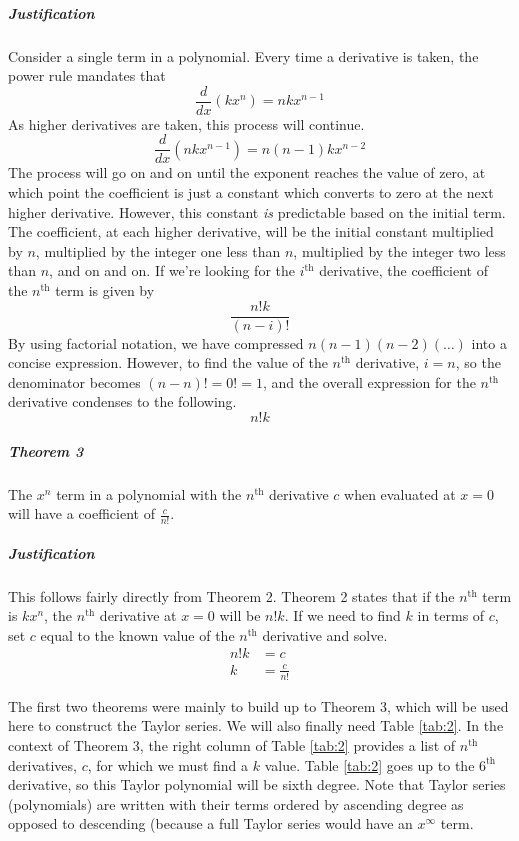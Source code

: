 \documentclass{article}
\begin{document}
\subparagraph{Justification} Consider a single term in a polynomial. Every time a derivative is taken, the power rule mandates that
\begin{equation*}
    \frac{d}{dx}(kx^n)=nkx^{n-1}
\end{equation*}
As higher derivatives are taken, this process will continue.
\begin{equation*}
    \frac{d}{dx}(nkx^{n-1})=n(n-1)kx^{n-2}
\end{equation*}
The process will go on and on until the exponent reaches the value of zero, at which point the coefficient is just a constant which converts to zero at the next higher derivative. However, this constant \emph{is} predictable based on the initial term. The coefficient, at each higher derivative, will be the initial constant multiplied by $n$, multiplied by the integer one less than $n$, multiplied by the integer two less than $n$, and on and on. If we're looking for the $i^\text{th}$ derivative, the coefficient of the $n^\text{th}$ term is given by
\begin{equation*}
    \frac{n!k}{(n-i)!}
\end{equation*}
By using factorial notation, we have compressed $n(n-1)(n-2)(\ldots)$ into a concise expression. However, to find the value of the $n^\text{th}$ derivative, $i=n$, so the denominator becomes $(n-n)!=0!=1$, and the overall expression for the $n^\text{th}$ derivative condenses to the following.
\begin{equation*}
    n!k
\end{equation*}
\subparagraph{Theorem 3} The $x^n$ term in a polynomial with the $n^\text{th}$ derivative $c$ when evaluated at $x=0$ will have a coefficient of $\frac{c}{n!}$.
\subparagraph{Justification} This follows fairly directly from Theorem 2. Theorem 2 states that if the $n^\text{th}$ term is $kx^n$, the $n^\text{th}$ derivative at $x=0$ will be $n!k$. If we need to find $k$ in terms of $c$, set $c$ equal to the known value of the $n^\text{th}$ derivative and solve.
\begin{align*}
    n!k &= c\\
    k &= \frac{c}{n!}
\end{align*}\par
\bigskip
The first two theorems were mainly to build up to Theorem 3, which will be used here to construct the Taylor series. We will also finally need Table \ref{tab:2}. In the context of Theorem 3, the right column of Table \ref{tab:2} provides a list of $n^\text{th}$ derivatives, $c$, for which we must find a $k$ value. Table \ref{tab:2} goes up to the $6^\text{th}$ derivative, so this Taylor polynomial will be sixth degree. Note that Taylor series (polynomials) are written with their terms ordered by ascending degree as opposed to descending (because a full Taylor series would have an $x^\infty$ term.\par
\end{document}
